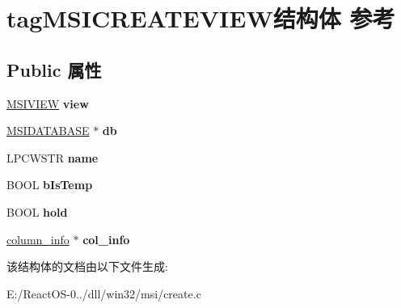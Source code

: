 \hypertarget{structtag_m_s_i_c_r_e_a_t_e_v_i_e_w}{}\section{tag\+M\+S\+I\+C\+R\+E\+A\+T\+E\+V\+I\+E\+W结构体 参考}
\label{structtag_m_s_i_c_r_e_a_t_e_v_i_e_w}
\subsection*{Public 属性}
\begin{DoxyCompactItemize}
\item 
\mbox{\label{structtag_m_s_i_c_r_e_a_t_e_v_i_e_w_ac1dc0054c18128c00315094d30b39163}} 
\hyperlink{structtag_m_s_i_v_i_e_w}{M\+S\+I\+V\+I\+EW} {\bfseries view}
\item 
\mbox{\label{structtag_m_s_i_c_r_e_a_t_e_v_i_e_w_a090d718e9179d281b5eee4bf2639d078}} 
\hyperlink{structtag_m_s_i_d_a_t_a_b_a_s_e}{M\+S\+I\+D\+A\+T\+A\+B\+A\+SE} $\ast$ {\bfseries db}
\item 
\mbox{\label{structtag_m_s_i_c_r_e_a_t_e_v_i_e_w_a0897c9a706dfcecc800510c0e19a1d3d}} 
L\+P\+C\+W\+S\+TR {\bfseries name}
\item 
\mbox{\label{structtag_m_s_i_c_r_e_a_t_e_v_i_e_w_a968b3a1d19e7d278df5133ecdbe23d5d}} 
B\+O\+OL {\bfseries b\+Is\+Temp}
\item 
\mbox{\label{structtag_m_s_i_c_r_e_a_t_e_v_i_e_w_ab244d0e13cc4ebad65d16ee4110f4a7a}} 
B\+O\+OL {\bfseries hold}
\item 
\mbox{\label{structtag_m_s_i_c_r_e_a_t_e_v_i_e_w_a89da734ac9ac0fcadf02ca5561c92900}} 
\hyperlink{struct__column__info}{column\+\_\+info} $\ast$ {\bfseries col\+\_\+info}
\end{DoxyCompactItemize}


该结构体的文档由以下文件生成\+:\begin{DoxyCompactItemize}
\item 
E\+:/\+React\+O\+S-\/0../dll/win32/msi/create.\+c\end{DoxyCompactItemize}
